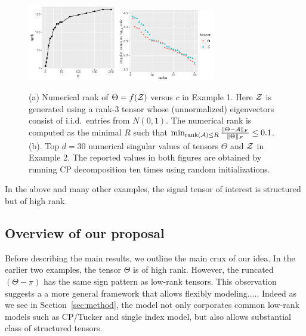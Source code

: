 \documentclass{article}
\theoremstyle{plain}
\theoremstyle{definition}
\newtheorem{example}{Example}
\def\rank{\textup{rank}}
\begin{document}
\begin{figure}
\includegraphics[width=3.9cm]{example1.pdf}
\includegraphics[width=4.2cm]{example2.pdf}
\caption{(a) Numerical rank of $\Theta=f(\mathcal{Z})$ versus $c$ in Example 1. Here $\mathcal{Z}$ is generated using a rank-3 tensor whose (unnormalized) eigenvectors consist of i.i.d.\ entries from $N(0,1)$. The numerical rank is computed as the minimal $R$ such that $\min_{\rank(\tA)\leq R}{ \FnormSize{}{\Theta-\tA}\over \FnormSize{}{\Theta}} \leq 0.1$. (b). Top $d=30$ numerical singular values of tensors $\Theta$ and $\mathcal{Z}$ in Example 2. The reported values in both figures are obtained by running CP decomposition ten times using random initializations. }\label{fig:example}
\end{figure}
In the above and many other examples, the signal tensor of interest is structured but of high rank. %



\subsection{Overview of our proposal}
Before describing the main results, we outline the main crux of our idea. In the earlier two examples, the tensor $\Theta$ is of high rank. However, the runcated $(\Theta-\pi)$ has the same sign pattern as low-rank tensors. This observation suggests a  a more general framework that allows flexibly modeling..... Indeed as we see in Section~\ref{sec:method}, the model not only corporates common low-rank models such as CP/Tucker and single index model, but also allows substantial class of structured tensors. 
\end{document}
